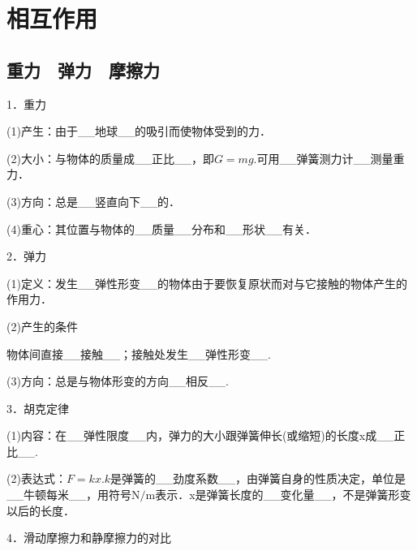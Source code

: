 \chapter{相互作用}

\section{重力　弹力　摩擦力}


1．重力

(1)产生：由于\_\_地球\_\_的吸引而使物体受到的力．

(2)大小：与物体的质量成\_\_正比\_\_，即$G=m g$.可用\_\_弹簧测力计\_\_测量重力．

(3)方向：总是\_\_竖直向下\_\_的．

(4)重心：其位置与物体的\_\_质量\_\_分布和\_\_形状\_\_有关．

2．弹力

(1)定义：发生\_\_弹性形变\_\_的物体由于要恢复原状而对与它接触的物体产生的作用力．

(2)产生的条件

物体间直接\_\_接触\_\_；接触处发生\_\_弹性形变\_\_.

(3)方向：总是与物体形变的方向\_\_相反\_\_.

3．胡克定律

(1)内容：在\_\_弹性限度\_\_内，弹力的大小跟弹簧伸长(或缩短)的长度x成\_\_正比\_\_.

(2)表达式：$F=kx$.$k$是弹簧的\_\_劲度系数\_\_，由弹簧自身的性质决定，单位是\_\_牛顿每米\_\_，用符号$\mathrm{N} / \mathrm{m}$表示．x是弹簧长度的\_\_变化量\_\_，不是弹簧形变以后的长度．

4．滑动摩擦力和静摩擦力的对比


